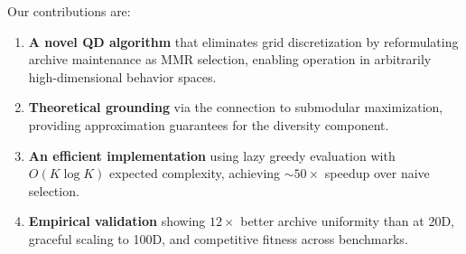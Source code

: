 Our contributions are:
\begin{enumerate}
    \item \textbf{A novel QD algorithm} that eliminates grid discretization by reformulating archive maintenance as MMR selection, enabling operation in arbitrarily high-dimensional behavior spaces.
    \item \textbf{Theoretical grounding} via the connection to submodular maximization, providing approximation guarantees for the diversity component.
    \item \textbf{An efficient implementation} using lazy greedy evaluation with $O(K \log K)$ expected complexity, achieving ${\sim}50\times$ speedup over naive selection.
    \item \textbf{Empirical validation} showing $12\times$ better archive uniformity than \map at 20D, graceful scaling to 100D, and competitive fitness across benchmarks.
\end{enumerate}
